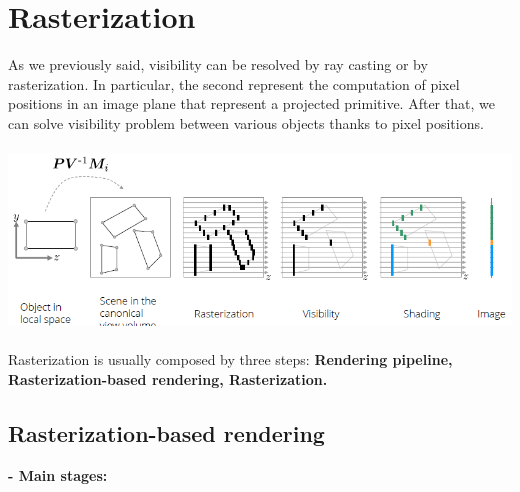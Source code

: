 \documentclass{article}
\begin{document}
\newpage
\section{Rasterization}
As we previously said, visibility can be resolved by ray casting or by rasterization. In particular, the second represent the computation of pixel positions in an image plane that represent a projected primitive. After that, we can solve visibility problem between various objects thanks to pixel positions.\\\\
\includegraphics[scale=0.6]{image52.png}\\\\
Rasterization is usually composed by three steps: \textbf{Rendering pipeline, Rasterization-based rendering, Rasterization.}\\

\subsection{Rasterization-based rendering}
\textbf{- Main stages:}\\
\end{document}
